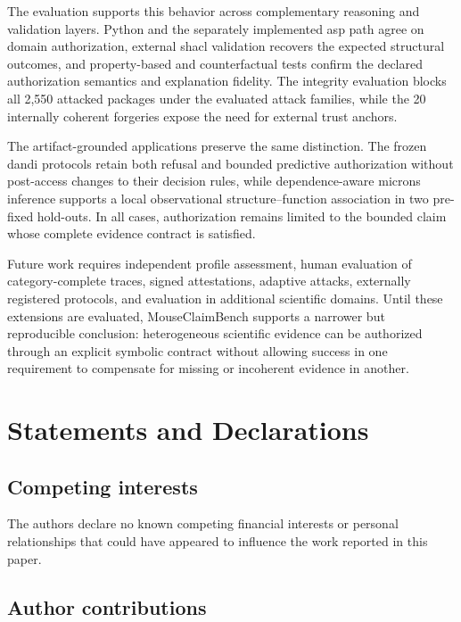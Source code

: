 \documentclass[11pt,a4paper]{article}
\begin{document}
The evaluation supports this behavior across complementary reasoning and validation layers. Python and the separately implemented \ac{asp} path agree on domain authorization, external \ac{shacl} validation recovers the expected structural outcomes, and property-based and counterfactual tests confirm the declared authorization semantics and explanation fidelity. The integrity evaluation blocks all 2,550 attacked packages under the evaluated attack families, while the 20 internally coherent forgeries expose the need for external trust anchors.

The artifact-grounded applications preserve the same distinction. The frozen \ac{dandi} protocols retain both refusal and bounded predictive authorization without post-access changes to their decision rules, while dependence-aware \ac{microns} inference supports a local observational structure--function association in two pre-fixed hold-outs. In all cases, authorization remains limited to the bounded claim whose complete evidence contract is satisfied.

Future work requires independent profile assessment, human evaluation of category-complete traces, signed attestations, adaptive attacks, externally registered protocols, and evaluation in additional scientific domains. Until these extensions are evaluated, MouseClaimBench supports a narrower but reproducible conclusion: heterogeneous scientific evidence can be authorized through an explicit symbolic contract without allowing success in one requirement to compensate for missing or incoherent evidence in another.


\section*{Statements and Declarations}
\subsection*{Competing interests}
\label{sec:competing-interest}

The authors declare no known competing financial interests or personal
relationships that could have appeared to influence the work reported in
this paper.

\subsection*{Author contributions}
\label{sec:credit}
\end{document}
